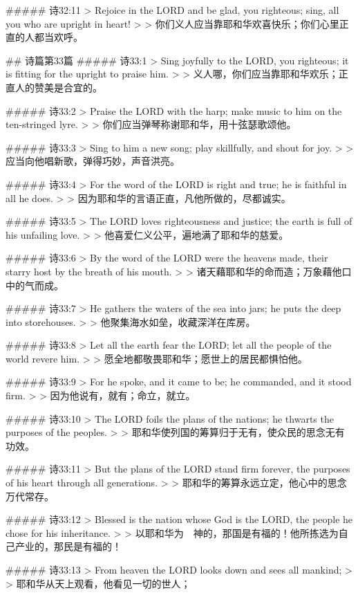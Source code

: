 ##### 诗32:11
> Rejoice in the LORD and be glad, you righteous; sing, all you who are upright in heart!
>
> 你们义人应当靠耶和华欢喜快乐；你们心里正直的人都当欢呼。


## 诗篇第33篇
##### 诗33:1
> Sing joyfully to the LORD, you righteous; it is fitting for the upright to praise him.
>
> 义人哪，你们应当靠耶和华欢乐；正直人的赞美是合宜的。


##### 诗33:2
> Praise the LORD with the harp; make music to him on the ten-stringed lyre.
>
> 你们应当弹琴称谢耶和华，用十弦瑟歌颂他。


##### 诗33:3
> Sing to him a new song; play skillfully, and shout for joy.
>
> 应当向他唱新歌，弹得巧妙，声音洪亮。


##### 诗33:4
> For the word of the LORD is right and true; he is faithful in all he does.
>
> 因为耶和华的言语正直，凡他所做的，尽都诚实。


##### 诗33:5
> The LORD loves righteousness and justice; the earth is full of his unfailing love.
>
> 他喜爱仁义公平，遍地满了耶和华的慈爱。


##### 诗33:6
> By the word of the LORD were the heavens made, their starry host by the breath of his mouth.
>
> 诸天藉耶和华的命而造；万象藉他口中的气而成。


##### 诗33:7
> He gathers the waters of the sea into jars; he puts the deep into storehouses.
>
> 他聚集海水如垒，收藏深洋在库房。


##### 诗33:8
> Let all the earth fear the LORD; let all the people of the world revere him.
>
> 愿全地都敬畏耶和华；愿世上的居民都惧怕他。


##### 诗33:9
> For he spoke, and it came to be; he commanded, and it stood firm.
>
> 因为他说有，就有；命立，就立。


##### 诗33:10
> The LORD foils the plans of the nations; he thwarts the purposes of the peoples.
>
> 耶和华使列国的筹算归于无有，使众民的思念无有功效。


##### 诗33:11
> But the plans of the LORD stand firm forever, the purposes of his heart through all generations.
>
> 耶和华的筹算永远立定，他心中的思念万代常存。


##### 诗33:12
> Blessed is the nation whose God is the LORD, the people he chose for his inheritance.
>
> 以耶和华为　神的，那国是有福的！他所拣选为自己产业的，那民是有福的！


##### 诗33:13
> From heaven the LORD looks down and sees all mankind;
>
> 耶和华从天上观看，他看见一切的世人；



